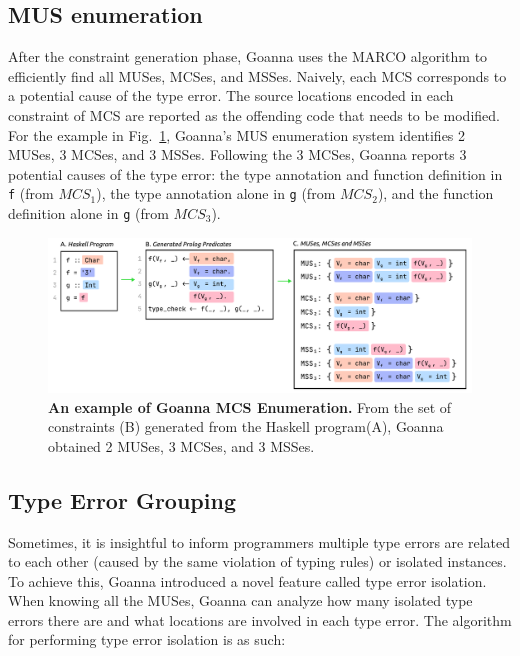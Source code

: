 \documentclass[pdflatex,lineno,sn-nature,Numbered]{sn-jnl}%
\begin{document}
    \subsection{MUS enumeration} \label{sub:enumeration}
 After the constraint generation phase,  Goanna uses the MARCO algorithm \cite{Liffiton2016-xi} to efficiently find all MUSes, MCSes, and MSSes. Naively, each MCS corresponds to a potential cause of the type error. The source locations encoded in each constraint of MCS are reported as the offending code that needs to be modified. For the example in Fig.~\ref{fig:enumeration-example}, Goanna's MUS enumeration system identifies 2 MUSes, 3 MCSes, and 3 MSSes. Following the 3 MCSes, Goanna reports 3 potential causes of the type error: the type annotation and function definition in \texttt{f} (from $MCS_1$), the type annotation alone in \texttt{g} (from $MCS_2$), and the function definition alone in \texttt{g} (from $MCS_3$). 
 
     \begin{figure}[ht!]
        \centering
        \includegraphics[width=\linewidth]{images/Enumeration-Example}
        \caption{\textbf{An example of Goanna MCS Enumeration.} From the set of constraints (B) generated from the Haskell program(A), Goanna obtained 2 MUSes, 3 MCSes, and 3 MSSes. }
        \label{fig:enumeration-example}
    \end{figure}
    


\subsection{Type Error Grouping} \label{sub:grouping}

Sometimes, it is insightful to inform programmers multiple type errors are related to each other (caused by the same violation of typing rules) or isolated instances. To achieve this, Goanna introduced a novel feature called type error isolation. When knowing all the MUSes, Goanna can analyze how many isolated type errors there are and what locations are involved in each type error. The algorithm for performing type error isolation is as such:
\end{document}
